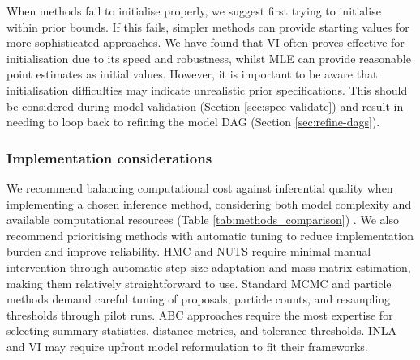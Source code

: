 \documentclass{article}
\begin{document}
When methods fail to initialise properly, we suggest first trying to initialise within prior bounds.
If this fails, simpler methods can provide starting values for more sophisticated approaches.
We have found that \ac{VI} often proves effective for initialisation due to its speed and robustness, whilst \ac{MLE} can provide reasonable point estimates as initial values.
However, it is important to be aware that initialisation difficulties may indicate unrealistic prior specifications.
This should be considered during model validation (Section \ref{sec:spec-validate}) and result in needing to loop back to refining the model \ac{DAG} (Section \ref{sec:refine-dags}).

\subsubsection{Implementation considerations}

We recommend balancing computational cost against inferential quality when implementing a chosen inference method, considering both model complexity and available computational resources (Table \ref{tab:methods_comparison}) \citep{funk2020choices}.
We also recommend prioritising methods with automatic tuning to reduce implementation burden and improve reliability.
\ac{HMC} and \ac{NUTS} require minimal manual intervention through automatic step size adaptation and mass matrix estimation, making them relatively straightforward to use.
Standard \ac{MCMC} and particle methods demand careful tuning of proposals, particle counts, and resampling thresholds through pilot runs.
\ac{ABC} approaches require the most expertise for selecting summary statistics, distance metrics, and tolerance thresholds.
\ac{INLA} and \ac{VI} may require upfront model reformulation to fit their frameworks.
\end{document}

